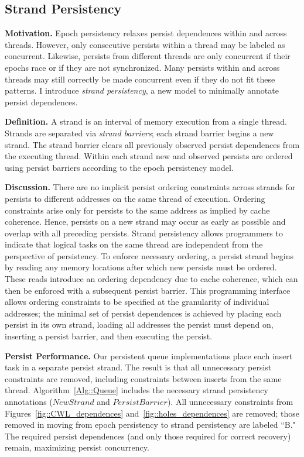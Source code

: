 \subsection{Strand Persistency}
\label{section:PersistencyModels:PersistStrands}

\textbf{Motivation.}
Epoch persistency relaxes persist dependences within and across threads.
However, only consecutive persists within a thread may be labeled as concurrent.
Likewise, persists from different threads are only concurrent if their epochs race or if they are not synchronized.
Many persists within and across threads may still correctly be made concurrent even if they do not fit these patterns.
I introduce \emph{strand persistency}, a new model to minimally annotate persist dependences.

\textbf{Definition.}
A strand is an interval of memory execution from a single thread.
Strands are separated via \emph{strand barriers}; each strand barrier begins a new strand.
The strand barrier clears all previously observed persist dependences from the executing thread.
Within each strand new and observed persists are ordered using persist barriers according to the epoch persistency model.

\textbf{Discussion.}
There are no implicit persist ordering constraints across strands for persists to different addresses on the same thread of execution.
Ordering constraints arise only for persists to the same address as implied by cache coherence.
Hence, persists on a new strand may occur as early as possible and overlap with all preceding persists.
Strand persistency allows programmers to indicate that logical tasks on the same thread are independent from the perspective of persistency.
To enforce necessary ordering, a persist strand begins by reading any memory locations after which new persists must be ordered.
These reads introduce an ordering dependency due to cache coherence, which can then be enforced with a subsequent persist barrier.
This programming interface allows ordering constraints to be specified at the granularity of individual addresses; the minimal set of persist dependences is achieved by placing each persist in its own strand, loading all addresses the persist must depend on, inserting a persist barrier, and then executing the persist.

\textbf{Persist Performance.}
Our persistent queue implementations place each insert task in a separate persist strand.
The result is that all unnecessary persist constraints are removed, including constraints between inserts from the same thread.
Algorithm~\ref{Alg::Queue} includes the necessary strand persistency annotations ($NewStrand$ and $PersistBarrier$).
All unnecessary constraints from Figures~\ref{fig::CWL_dependences} and~\ref{fig::holes_dependences} are removed; those removed in moving from epoch persistency to strand persistency are labeled ``B."
The required persist dependences (and only those required for correct recovery) remain, maximizing persist concurrency.


